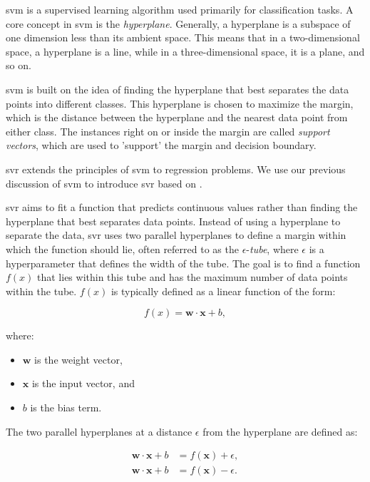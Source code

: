 \gls{svm} is a supervised learning algorithm used primarily for classification tasks.
A core concept in \gls{svm} is the \textit{hyperplane}.
Generally, a hyperplane is a subspace of one dimension less than its ambient space.
This means that in a two-dimensional space, a hyperplane is a line, while in a three-dimensional space, it is a plane, and so on.

\gls{svm} is built on the idea of finding the hyperplane that best separates the data points into different classes.
This hyperplane is chosen to maximize the margin, which is the distance between the hyperplane and the nearest data point from either class.
The instances right on or inside the margin are called \textit{support vectors}, which are used to 'support' the margin and decision boundary.

\gls{svr} extends the principles of \gls{svm} to regression problems.
We use our previous discussion of \gls{svm} to introduce \gls{svr} based on \citet{druckerSVR}.

\gls{svr} aims to fit a function that predicts continuous values rather than finding the hyperplane that best separates data points.
Instead of using a hyperplane to separate the data, \gls{svr} uses two parallel hyperplanes to define a margin within which the function should lie, often referred to as the $\epsilon$-\textit{tube}, where $\epsilon$ is a hyperparameter that defines the width of the tube.
The goal is to find a function $f(x)$ that lies within this tube and has the maximum number of data points within the tube.
$f(x)$ is typically defined as a linear function of the form:

$$
f(x) = \mathbf{w} \cdot \mathbf{x} + b,
$$

where:

\begin{itemize}
	\item $\mathbf{w}$ is the weight vector,
	\item $\mathbf{x}$ is the input vector, and
	\item $b$ is the bias term.
\end{itemize}

The two parallel hyperplanes at a distance $\epsilon$ from the hyperplane are defined as:

$$
\begin{aligned}
    \mathbf{w} \cdot \mathbf{x} + b &= f(\mathbf{x}) + \epsilon, \\
    \mathbf{w} \cdot \mathbf{x} + b &= f(\mathbf{x}) - \epsilon.
\end{aligned}
$$

